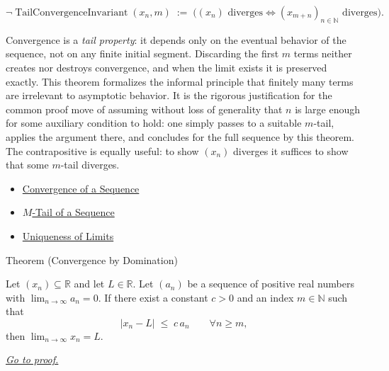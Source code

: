 \begin{remark*}
\[
\lnot\operatorname{TailConvergenceInvariant}(x_n,m)
\;:=\;
\bigl((x_n)\text{ diverges}\Longleftrightarrow (x_{m+n})_{n\in\mathbb{N}}\text{ diverges}\bigr).
\]
\end{remark*}

\begin{remark*}[Interpretation]
Convergence is a \emph{tail property}: it depends only on the
eventual behavior of the sequence, not on any finite initial
segment. Discarding the first $m$ terms neither creates nor
destroys convergence, and when the limit exists it is preserved
exactly. This theorem formalizes the informal principle that
finitely many terms are irrelevant to asymptotic behavior. It is
the rigorous justification for the common proof move of assuming
without loss of generality that $n$ is large enough for some
auxiliary condition to hold: one simply passes to a suitable
$m$-tail, applies the argument there, and concludes for the full
sequence by this theorem. The contrapositive is equally useful:
to show $(x_n)$ diverges it suffices to show that some $m$-tail
diverges.
\end{remark*}

\begin{remark*}[Dependencies]
\begin{itemize}
  \item \hyperref[def:convergent-sequence]{Convergence of a Sequence}
  \item \hyperref[def:m-tail]{$M$-Tail of a Sequence}
  \item \hyperref[thm:uniqueness-of-limits]{Uniqueness of Limits}
\end{itemize}
\end{remark*}









\begin{theorembox}{Theorem (Convergence by Domination)}
\begin{theorem}
\label{thm:convergence-by-domination}

Let $(x_n) \subseteq \mathbb{R}$ and let $L \in \mathbb{R}$. Let
$(a_n)$ be a sequence of positive real numbers with
$\displaystyle\lim_{n \to \infty} a_n = 0$. If there exist a constant
$c > 0$ and an index $m \in \mathbb{N}$ such that
\[
    |x_n - L| \;\le\; c\, a_n \qquad \forall n \ge m,
\]
then $\displaystyle\lim_{n \to \infty} x_n = L$.

\smallskip
\noindent
\hyperref[prf:convergence-by-domination]{\textit{Go to proof.}}
\end{theorem}
\end{theorembox}

